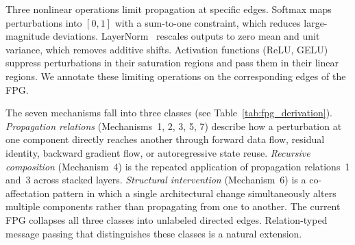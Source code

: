 Three nonlinear operations limit propagation at specific edges. Softmax maps perturbations into $[0,1]$ with a sum-to-one constraint, which reduces large-magnitude deviations. LayerNorm~\cite{ba2016layer} rescales outputs to zero mean and unit variance, which removes additive shifts. Activation functions (ReLU, GELU) suppress perturbations in their saturation regions and pass them in their linear regions. We annotate these limiting operations on the corresponding edges of the FPG.

The seven mechanisms fall into three classes (see Table~\ref{tab:fpg_derivation}). \emph{Propagation relations} (Mechanisms~1, 2, 3, 5, 7) describe how a perturbation at one component directly reaches another through forward data flow, residual identity, backward gradient flow, or autoregressive state reuse. \emph{Recursive composition} (Mechanism~4) is the repeated application of propagation relations~1 and~3 across stacked layers. \emph{Structural intervention} (Mechanism~6) is a co-affectation pattern in which a single architectural change simultaneously alters multiple components rather than propagating from one to another. The current FPG collapses all three classes into unlabeled directed edges. Relation-typed message passing that distinguishes these classes is a natural extension.


